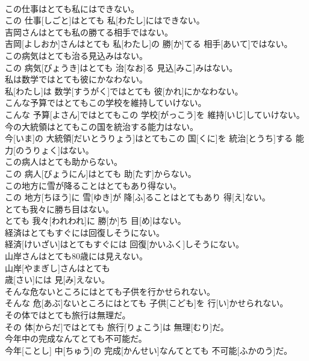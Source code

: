 \documentclass[8pt]{extreport}
\begin{document}
\begin{CJK}{UTF8}{min}
\\	この仕事はとても私にはできない。	
\\	この 仕事[しごと]はとても 私[わたし]にはできない。
\\	吉岡さんはとても私の勝てる相手ではない。	
\\	吉岡[よしおか]さんはとても 私[わたし]の 勝[か]てる 相手[あいて]ではない。
\\	この病気はとても治る見込みはない。	
\\	この 病気[びょうき]はとても 治[なお]る 見込[みこ]みはない。
\\	私は数学ではとても彼にかなわない。	
\\	私[わたし]は 数学[すうがく]ではとても 彼[かれ]にかなわない。
\\	こんな予算ではとてもこの学校を維持していけない。	
\\	こんな 予算[よさん]ではとてもこの 学校[がっこう]を 維持[いじ]していけない。
\\	今の大統領はとてもこの国を統治する能力はない。	
\\	今[いま]の 大統領[だいとうりょう]はとてもこの 国[くに]を 統治[とうち]する 能力[のうりょく]はない。
\\	この病人はとても助からない。	
\\	この 病人[びょうにん]はとても 助[たす]からない。
\\	この地方に雪が降ることはとてもあり得ない。	
\\	この 地方[ちほう]に 雪[ゆき]が 降[ふ]ることはとてもあり 得[え]ない。
\\	とても我々に勝ち目はない。	
\\	とても 我々[われわれ]に 勝[か]ち 目[め]はない。
\\	経済はとてもすぐには回復しそうにない。	
\\	経済[けいざい]はとてもすぐには 回復[かいふく]しそうにない。
\\	山岸さんはとても80歳には見えない。	
\\	山岸[やまぎし]さんはとても 
\\	歳[さい]には 見[み]えない。
\\	そんな危ないところにはとても子供を行かせられない。	
\\	そんな 危[あぶ]ないところにはとても 子供[こども]を 行[い]かせられない。
\\	その体ではとても旅行は無理だ。	
\\	その 体[からだ]ではとても 旅行[りょこう]は 無理[むり]だ。
\\	今年中の完成なんてとても不可能だ。	
\\	今年[ことし] 中[ちゅう]の 完成[かんせい]なんてとても 不可能[ふかのう]だ。

\end{CJK}
\end{document}
